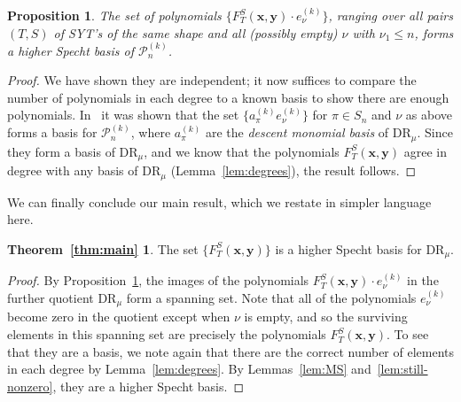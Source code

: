 \documentclass[11pt]{article}
\newtheorem{prop}[theo]{Proposition}
\theoremstyle{definition}
\numberwithin{equation}{section}
\newcommand{\DR}{\mathrm{DR}}
\newtheorem*{MainTheorem}{Theorem~\ref{thm:main}}
\begin{document}
\begin{prop}\label{prop:intermediate-basis}
	The set of polynomials $\{F_T^S(\mathbf{x},\mathbf{y})\cdot e_\nu^{(k)}\}$, ranging over all pairs $(T,S)$ of SYT's of the same shape and all (possibly empty) $\nu$ with $\nu_1\le n$, forms a higher Specht basis of $\mathcal{P}_n^{(k)}$.
\end{prop}

\begin{proof}
	We have shown they are independent; it now suffices to compare the number of polynomials in each degree to a known basis to show there are enough polynomials.  In~\cite{HookBases} it was shown that the set $\{a_\pi^{(k)}e_\nu^{(k)}\}$ for $\pi\in S_n$ and $\nu$ as above forms a basis for $\mathcal{P}_n^{(k)}$, where  $a_\pi^{(k)}$ are the \textit{descent monomial basis} of $\DR_\mu$.  Since they form a basis of $\DR_\mu$, and we know that the polynomials $F_T^S(\mathbf{x},\mathbf{y})$ agree in degree with any basis of $\DR_\mu$ (Lemma~\ref{lem:degrees}), the result follows.
\end{proof}

We can finally conclude our main result, which we restate in simpler language here. 

\begin{MainTheorem}
	The set $\{F_T^S(\mathbf{x},\mathbf{y})\}$ is a higher Specht basis for $\DR_\mu$.
\end{MainTheorem}

\begin{proof}
	By Proposition~\ref{prop:intermediate-basis}, the images of the polynomials $F_T^S(\mathbf{x},\mathbf{y})\cdot e_\nu^{(k)}$ in the further quotient $\DR_\mu$ form a spanning set. 
	Note that all of the polynomials $e_\nu^{(k)}$ become zero in the quotient except when $\nu$ is empty, and so the surviving elements in this spanning set are precisely the polynomials $F_T^S(\mathbf{x},\mathbf{y})$.  To see that they are a basis, we note again that there are the correct number of elements in each degree by Lemma~\ref{lem:degrees}.  By Lemmas~\ref{lem:MS} and~\ref{lem:still-nonzero}, they are a higher Specht basis. 
\end{proof}
\end{document}
